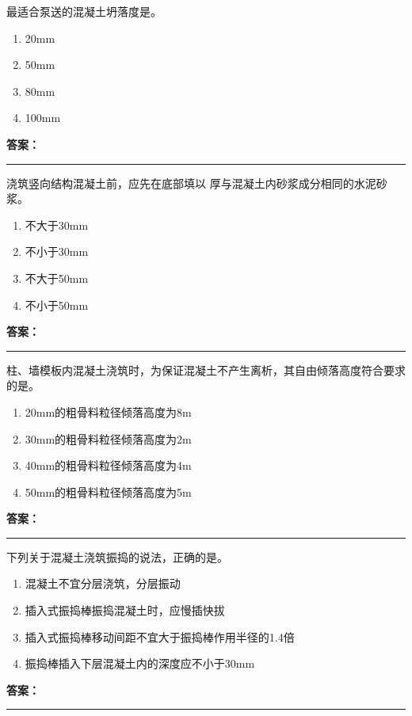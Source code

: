 \documentclass[UTF8,fontset=fandol,11pt]{ctexart}
\newcommand{\answerline}{\textcolor{answerred}{\rule{2.4cm}{0.7pt}}}
\begin{document}
\vspace{0.2em}

\begin{quizbox}[title={第 71 题}]
最适合泵送的混凝土坍落度是。\\
\begin{enumerate}[label=\Alph*.]
\item 20mm
\item 50mm
\item 80mm
\item 100mm
\end{enumerate}
\textbf{\textcolor{answerred}{答案：}} \answerline
\end{quizbox}

\vspace{0.2em}

\begin{quizbox}[title={第 72 题}]
浇筑竖向结构混凝土前，应先在底部填以 厚与混凝土内砂浆成分相同的水泥砂浆。\\
\begin{enumerate}[label=\Alph*.]
\item 不大于30mm
\item 不小于30mm
\item 不大于50mm
\item 不小于50mm
\end{enumerate}
\textbf{\textcolor{answerred}{答案：}} \answerline
\end{quizbox}

\vspace{0.2em}

\begin{quizbox}[title={第 73 题}]
柱、墙模板内混凝土浇筑时，为保证混凝土不产生离析，其自由倾落高度符合要求的是。\\
\begin{enumerate}[label=\Alph*.]
\item 20mm的粗骨料粒径倾落高度为8m
\item 30mm的粗骨料粒径倾落高度为2m
\item 40mm的粗骨料粒径倾落高度为4m
\item 50mm的粗骨料粒径倾落高度为5m
\end{enumerate}
\textbf{\textcolor{answerred}{答案：}} \answerline
\end{quizbox}

\vspace{0.2em}

\begin{quizbox}[title={第 74 题}]
下列关于混凝土浇筑振捣的说法，正确的是。\\
\begin{enumerate}[label=\Alph*.]
\item 混凝土不宜分层浇筑，分层振动
\item 插入式振捣棒振捣混凝土时，应慢插快拔
\item 插入式振捣棒移动间距不宜大于振捣棒作用半径的1.4倍
\item 振捣棒插入下层混凝土内的深度应不小于30mm
\end{enumerate}
\textbf{\textcolor{answerred}{答案：}} \answerline
\end{quizbox}
\end{document}
